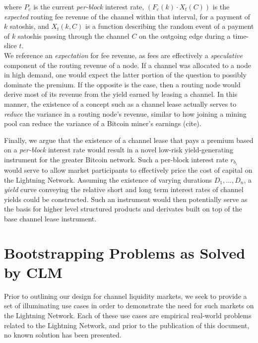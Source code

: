 \documentclass[10pt,a4paper]{article}
\theoremstyle{definition}
\begin{document}
where $P_c$ is the current \emph{per-block} interest rate, $(F_c(k)\cdot
X_{t}(C))$ is the \emph{expected} routing fee revenue of the channel within
that interval, for a payment of $k$ satoshis, and $X_{t}(k, C)$ is a function
describing the random event of a payment of $k$ satoshis passing through the
channel $C$ on the outgoing edge during a time-slice $t$. \\

We reference an \emph{expectation} for fee revenue, as fees are effectively a
\emph{speculative} component of the routing revenue of a node. If a channel was
allocated to a node in high demand, one would expect the latter portion of the
question to possibly dominate the premium. If the opposite is the case, then a
routing node would derive most of its revenue from the yield earned by leasing
a channel. In this manner, the existence of a concept such as a channel lease
actually serves to \emph{reduce} the variance in a routing node's revenue,
similar to how joining a mining pool can reduce the variance of a Bitcoin miner's
earnings (cite). 

Finally, we argue that the existence of a channel lease that pays a premium
based on a \emph{per-block} interest rate would result in a novel low-risk
yield-generating instrument for the greater Bitcoin network. Such a per-block
interest rate $r_{b_i}$ would serve to allow market participants to effectively
price the cost of capital on the Lightning Network. Assuming the existence of
varying durations ${D_1, ..., D_n}$, a \emph{yield} curve conveying the relative
short and long term interest rates of channel yields could be constructed. Such
an instrument would then potentially serve as the basis for higher level
structured products and derivates built on top of the base channel lease
instrument. 


\section{Bootstrapping Problems as Solved by CLM}

Prior to outlining our design for channel liquidity markets, we seek to provide
a set of illuminating use cases in order to demonstrate the need for such
markets on the Lightning Network. Each of these use cases are empirical
real-world problems related to the Lightning Network, and prior to the
publication of this document, no known solution has been presented. 
\end{document}
